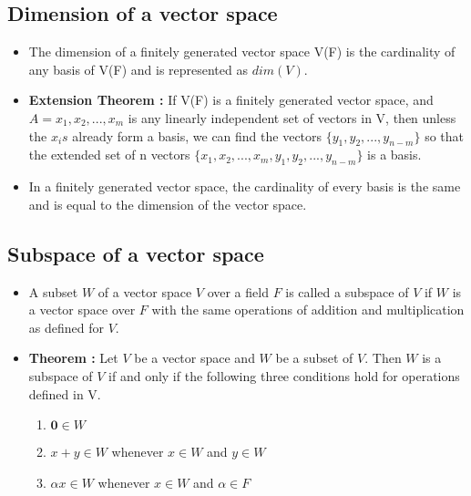 \documentclass[twoside]{article}
\begin{document}
	\subsection{Dimension of a vector space}
	\begin{itemize}
		\item The dimension of a finitely generated vector space V(F) is the cardinality of any basis of V(F) and is represented as $dim(V)$.
		\item {\bf Extension Theorem : } If V(F) is a finitely generated vector space, and $A = {x_1, x_2, ..., x_m}$ is any linearly independent set of vectors in V, then unless the $x_i s$ already form a basis, we can find the vectors $\{y_1, y_2, ..., y_{n-m}\}$ so that the extended set of n vectors $\{x_1, x_2, ..., x_m, y_1, y_2, ..., y_{n-m}\}$ is a basis.
		\item In a finitely generated vector space, the cardinality of every basis is the same and is equal to the dimension of the vector space.
	\end{itemize}
	\subsection{Subspace of a vector space}
	\begin{itemize}
		\item A subset $W$ of a vector space $V$ over a field $F$ is called a subspace of $V$ if $W$ is a vector space over $F$ with the same operations of addition and multiplication as defined for $V$.
		\item {\bf Theorem :} Let $V$ be a vector space and $W$ be a subset of $V$. Then $W$ is a subspace of $V$ if and only if the following three conditions hold for operations defined in V.
		\begin{enumerate}
			\item $\mathbf{0} \in W$
			\item $x+y \in W$ whenever $x \in W$ and $y \in W$
			\item $\alpha x \in W$ whenever $x \in W$ and $\alpha \in F$
		\end{enumerate}
	\end{itemize}
\end{document}
